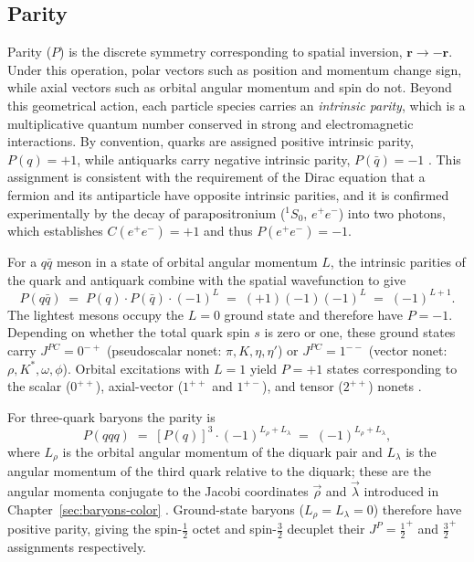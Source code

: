 \FloatBarrier
 
\subsection{Parity}
\label{subsec:parity}
 
Parity ($P$) is the discrete symmetry corresponding to spatial inversion,
$\mathbf{r} \to -\mathbf{r}$. Under this operation, polar vectors such as position
and momentum change sign, while axial vectors such as orbital angular momentum
and spin do not. Beyond this geometrical action, each particle species carries an
\emph{intrinsic parity}, which is a multiplicative quantum number conserved in
strong and electromagnetic interactions. By convention, quarks are assigned
positive intrinsic parity, $P(q) = +1$, while antiquarks carry negative intrinsic
parity, $P(\bar{q}) = -1$ \cite[Ch.~2]{Amsler2018}. This assignment is consistent
with the requirement of the Dirac equation that a fermion and its antiparticle have
opposite intrinsic parities, and it is confirmed experimentally by the decay of
parapositronium ($^1S_0$, $e^+e^-$) into two photons, which establishes
$C(e^+e^-) = +1$ and thus $P(e^+e^-) = -1$.
 
For a $q\bar{q}$ meson in a state of orbital angular momentum $L$, the
intrinsic parities of the quark and antiquark combine with the spatial wavefunction
to give
\begin{equation}
    P(q\bar{q})
    \;=\; P(q)\cdot P(\bar{q})\cdot(-1)^L
    \;=\; (+1)(-1)(-1)^L
    \;=\; (-1)^{L+1}.
    \label{eq:meson_parity}
\end{equation}
The lightest mesons occupy the $L = 0$ ground state and therefore have $P = -1$.
Depending on whether the total quark spin $s$ is zero or one, these ground states
carry $J^{PC} = 0^{-+}$ (pseudoscalar nonet: $\pi, K, \eta, \eta'$) or
$J^{PC} = 1^{--}$ (vector nonet: $\rho, K^*, \omega, \phi$). Orbital excitations
with $L = 1$ yield $P = +1$ states corresponding to the scalar ($0^{++}$),
axial-vector ($1^{++}$ and $1^{+-}$), and tensor ($2^{++}$) nonets
\cite[Ch.~4]{Amsler2018}.
 
For three-quark baryons the parity is
\begin{equation}
    P(qqq)
    \;=\; [P(q)]^3\cdot(-1)^{L_{\rho}+L_{\lambda}}
    \;=\; (-1)^{L_{\rho}+L_{\lambda}},
    \label{eq:baryon_parity}
\end{equation}
where $L_{\rho}$ is the orbital angular momentum of the diquark pair and
$L_{\lambda}$ is the angular momentum of the third quark relative to the diquark;
these are the angular momenta conjugate to the Jacobi coordinates $\vec\rho$ and
$\vec\lambda$ introduced in Chapter~\ref{sec:baryons-color}
\cite[Ch.~13]{Amsler2018}. Ground-state baryons ($L_{\rho} = L_{\lambda} = 0$) therefore
have positive parity, giving the spin-$\tfrac{1}{2}$ octet and spin-$\tfrac{3}{2}$
decuplet their $J^P = \tfrac{1}{2}^+$ and $\tfrac{3}{2}^+$ assignments
respectively.
 
